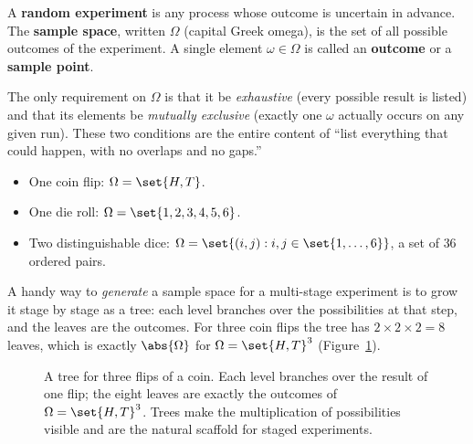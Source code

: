 \begin{definition}
\label{ch03:def-sample-space}
A \textbf{random experiment} is any process whose outcome is uncertain in
advance. The \textbf{sample space}, written $\Omega$ (capital Greek omega), is
the set of all possible outcomes of the experiment. A single element
$\omega \in \Omega$ is called an \textbf{outcome} or a \textbf{sample point}.
\end{definition}

The only requirement on $\Omega$ is that it be \emph{exhaustive} (every possible
result is listed) and that its elements be \emph{mutually exclusive} (exactly one
$\omega$ actually occurs on any given run). These two conditions are the entire
content of ``list everything that could happen, with no overlaps and no gaps.''

\begin{example}
\label{ch03:ex-three-spaces}
\begin{itemize}
\item One coin flip: $\Omega = \set{H, T}$.
\item One die roll: $\Omega = \set{1,2,3,4,5,6}$.
\item Two distinguishable dice: $\Omega = \set{(i,j) : i,j \in \set{1,\dots,6}}$,
a set of $36$ ordered pairs.
\end{itemize}
\end{example}

A handy way to \emph{generate} a sample space for a multi-stage experiment is to
grow it stage by stage as a tree: each level branches over the possibilities at
that step, and the leaves are the outcomes. For three coin flips the tree has
$2 \times 2 \times 2 = 8$ leaves, which is exactly $\abs{\Omega}$ for
$\Omega = \set{H,T}^3$ (Figure~\ref{ch03:fig-tree}).

\begin{figure}[H]
\centering
{}
\caption{A tree for three flips of a coin. Each level branches over the result of
one flip; the eight leaves are exactly the outcomes of
$\Omega=\set{H,T}^3$. Trees make the multiplication of possibilities visible and
are the natural scaffold for staged experiments.}
\label{ch03:fig-tree}
\end{figure}

